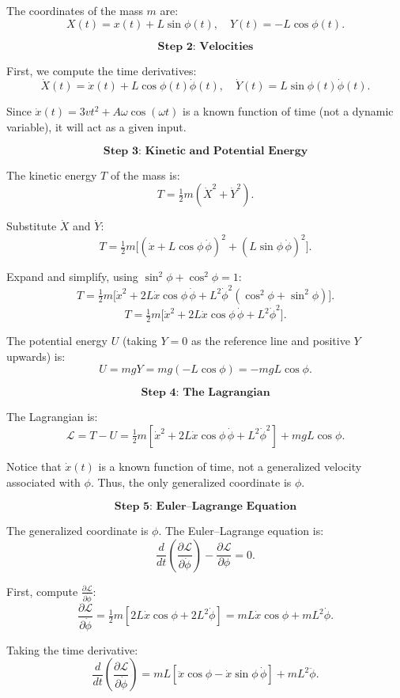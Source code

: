 \documentclass{article}
\begin{document}
The coordinates of the mass \( m \) are:
\[
X(t) = x(t) + L\sin\phi(t), \quad Y(t) = -L\cos\phi(t).
\]

\[
\textbf{Step 2: Velocities}
\]

First, we compute the time derivatives:
\[
\dot{X}(t) = \dot{x}(t) + L\cos\phi(t)\dot{\phi}(t), \quad \dot{Y}(t) = L\sin\phi(t)\dot{\phi}(t).
\]

Since \(\dot{x}(t) = 3vt^2 + A\omega\cos(\omega t)\) is a known function of time (not a dynamic variable), it will act as a given input.

\[
\textbf{Step 3: Kinetic and Potential Energy}
\]

The kinetic energy \( T \) of the mass is:
\[
T = \tfrac{1}{2}m(\dot{X}^2 + \dot{Y}^2).
\]

Substitute \(\dot{X}\) and \(\dot{Y}\):
\[
T = \tfrac{1}{2}m\bigl[(\dot{x} + L\cos\phi\,\dot{\phi})^2 + (L\sin\phi\,\dot{\phi})^2\bigr].
\]

Expand and simplify, using \(\sin^2\phi + \cos^2\phi = 1\):
\[
T = \tfrac{1}{2}m\bigl[\dot{x}^2 + 2L\dot{x}\cos\phi\,\dot{\phi} + L^2\dot{\phi}^2(\cos^2\phi+\sin^2\phi)\bigr].
\]
\[
T = \tfrac{1}{2}m\bigl[\dot{x}^2 + 2L\dot{x}\cos\phi\,\dot{\phi} + L^2\dot{\phi}^2\bigr].
\]

The potential energy \( U \) (taking \( Y=0 \) as the reference line and positive \( Y \) upwards) is:
\[
U = m g Y = m g(-L\cos\phi) = -m g L \cos\phi.
\]

\[
\textbf{Step 4: The Lagrangian}
\]

The Lagrangian is:
\[
\mathcal{L} = T - U = \tfrac{1}{2}m[\dot{x}^2 + 2L\dot{x}\cos\phi\,\dot{\phi} + L^2\dot{\phi}^2] + mgL\cos\phi.
\]

Notice that \(\dot{x}(t)\) is a known function of time, not a generalized velocity associated with \(\phi\). Thus, the only generalized coordinate is \(\phi\).

\[
\textbf{Step 5: Euler–Lagrange Equation}
\]

The generalized coordinate is \(\phi\). The Euler–Lagrange equation is:
\[
\frac{d}{dt}\left(\frac{\partial \mathcal{L}}{\partial \dot{\phi}}\right) - \frac{\partial \mathcal{L}}{\partial \phi} = 0.
\]

First, compute \(\frac{\partial \mathcal{L}}{\partial \dot{\phi}}\):
\[
\frac{\partial \mathcal{L}}{\partial \dot{\phi}} = \tfrac{1}{2}m[2L\dot{x}\cos\phi + 2L^2\dot{\phi}] = mL\dot{x}\cos\phi + mL^2\dot{\phi}.
\]

Taking the time derivative:
\[
\frac{d}{dt}\left(\frac{\partial \mathcal{L}}{\partial \dot{\phi}}\right) = mL[\ddot{x}\cos\phi - \dot{x}\sin\phi\,\dot{\phi}] + mL^2\ddot{\phi}.
\]
\end{document}
